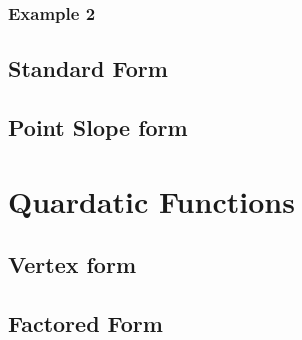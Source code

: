\documentclass[12pt]{article}
\begin{document}
		\subsubsection{Example 2}
	\subsection{Standard Form}
	\subsection{Point Slope form}
\section{Quardatic Functions}
	\subsection{Vertex form}
	\subsection{Factored Form}
\end{document}
